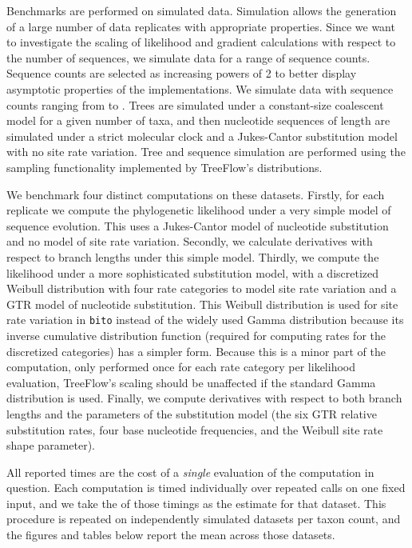 Benchmarks are performed on simulated data. Simulation allows the generation of a large number of data replicates with appropriate properties. Since we want to investigate the scaling of likelihood and gradient calculations with respect to the number of sequences, we simulate data for a range of sequence counts. Sequence counts are selected as increasing powers of 2 to better display asymptotic properties of the implementations. We simulate data with sequence counts ranging from  to . Trees are simulated under a constant-size coalescent model for a given number of taxa, and then nucleotide sequences of length  are simulated under a strict molecular clock and a Jukes-Cantor substitution model with no site rate variation. Tree and sequence simulation are performed using the sampling functionality implemented by TreeFlow's distributions.

We benchmark four distinct computations on these datasets. Firstly, for each replicate we compute the phylogenetic likelihood under a very simple model of sequence evolution. This uses a Jukes-Cantor model of nucleotide substitution and no model of site rate variation. Secondly, we calculate derivatives with respect to branch lengths under this simple model. Thirdly, we compute the likelihood under a more sophisticated substitution model, with a discretized Weibull distribution with four rate categories to model site rate variation and a GTR model of nucleotide substitution. This Weibull distribution is used for site rate variation in \texttt{bito} instead of the widely used Gamma distribution because its inverse cumulative distribution function (required for computing rates for the discretized categories) has a simpler form. Because this is a minor part of the computation, only performed once for each rate category per likelihood evaluation, TreeFlow's scaling should be unaffected if the standard Gamma distribution is used. Finally, we compute derivatives with respect to both branch lengths and the parameters of the substitution model (the six GTR relative substitution rates, four base nucleotide frequencies, and the Weibull site rate shape parameter).

All reported times are the cost of a \textit{single} evaluation of the computation in question. Each computation is timed individually over  repeated calls on one fixed input, and we take the  of those timings as the estimate for that dataset. This procedure is repeated on  independently simulated datasets per taxon count, and the figures and tables below report the mean across those datasets.


